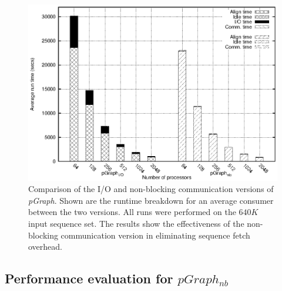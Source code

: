 \documentclass[10pt,journal,letterpaper,compsoc]{IEEEtran}
\begin{document}
\begin{figure}[tb]
\centerline{
						\includegraphics[scale=0.7]{csBreak.eps}
            }
\caption{
Comparison of the I/O and non-blocking communication versions of {\it pGraph}.  Shown are the runtime breakdown for an average consumer between the two versions. All runs were performed on the $640K$ input sequence set. The results show the effectiveness of the non-blocking communication version in eliminating sequence fetch overhead.
}
\label{figConsumerBreakdown}
\end{figure}

\subsection{Performance evaluation for $pGraph_{nb}$}
\label{secPerf}
\end{document}
